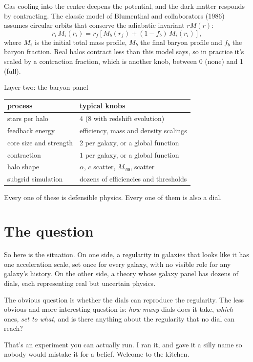 Gas cooling into the centre deepens the potential, and the dark matter responds by contracting. The classic model of Blumenthal and collaborators (1986) assumes circular orbits that conserve the adiabatic invariant $rM(r)$:
\begin{equation}
r_i\,M_i(r_i)=r_f\left[M_b(r_f)+(1-f_b)\,M_i(r_i)\right],
\end{equation}
where $M_i$ is the initial total mass profile, $M_b$ the final baryon profile and $f_b$ the baryon fraction. Real halos contract less than this model says, so in practice it's scaled by a contraction fraction, which is another knob, between 0 (none) and 1 (full).



\begin{knobbox}{Layer two: the baryon panel}
\begin{tabular}{@{}lp{6.2cm}@{}}
\toprule
process & typical knobs\\
\midrule
stars per halo & 4 (8 with redshift evolution)\\
feedback energy & efficiency, mass and density scalings\\
core size and strength & 2 per galaxy, or a global function\\
contraction & 1 per galaxy, or a global function\\
halo shape & $\alpha$, $c$ scatter, $M_{200}$ scatter\\
subgrid simulation & dozens of efficiencies and thresholds\\
\bottomrule
\end{tabular}
\smallskip
Every one of these is defensible physics. Every one of them is also a dial.
\end{knobbox}




\section{The question}

So here is the situation. On one side, a regularity in galaxies that looks like it has one acceleration scale, set once for every galaxy, with no visible role for any galaxy's history. On the other side, a theory whose galaxy panel has dozens of dials, each representing real but uncertain physics.

The obvious question is whether the dials can reproduce the regularity. The less obvious and more interesting question is: \emph{how many} dials does it take, \emph{which} ones, \emph{set to what}, and is there anything about the regularity that no dial can reach?

That's an experiment you can actually run. I ran it, and gave it a silly name so nobody would mistake it for a belief. Welcome to the kitchen.
